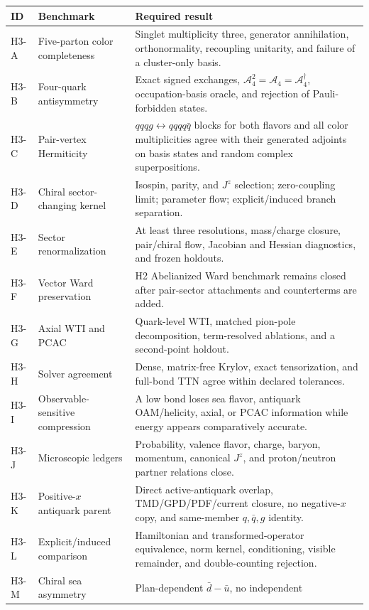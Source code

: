 \documentclass[11pt]{article}
\newcommand{\cA}{\mathcal A}
\newcommand{\Jz}{J^z}
\begin{document}
\begin{longtable}{L{0.12\textwidth}L{0.28\textwidth}L{0.50\textwidth}}
\toprule
ID & Benchmark & Required result\\
\midrule
\endhead
H3-A & Five-parton color completeness & Singlet multiplicity three,
generator annihilation, orthonormality, recoupling unitarity, and failure of a
cluster-only basis.\\
H3-B & Four-quark antisymmetry & Exact signed exchanges,
\(\cA_4^2=\cA_4=\cA_4^{\dagger}\), occupation-basis oracle, and rejection of
Pauli-forbidden states.\\
H3-C & Pair-vertex Hermiticity & \(qqqg\leftrightarrow qqqq\bar q\) blocks
for both flavors and all color multiplicities agree with their generated
adjoints on basis states and random complex superpositions.\\
H3-D & Chiral sector-changing kernel & Isospin, parity, and \(\Jz\) selection;
zero-coupling limit; parameter flow; explicit/induced branch separation.\\
H3-E & Sector renormalization & At least three resolutions, mass/charge
closure, pair/chiral flow, Jacobian and Hessian diagnostics, and frozen
holdouts.\\
H3-F & Vector Ward preservation & H2 Abelianized Ward benchmark remains
closed after pair-sector attachments and counterterms are added.\\
H3-G & Axial WTI and PCAC & Quark-level WTI, matched pion-pole
decomposition, term-resolved ablations, and a second-point holdout.\\
H3-H & Solver agreement & Dense, matrix-free Krylov, exact tensorization, and
full-bond TTN agree within declared tolerances.\\
H3-I & Observable-sensitive compression & A low bond loses sea flavor,
antiquark OAM/helicity, axial, or PCAC information while energy appears
comparatively accurate.\\
H3-J & Microscopic ledgers & Probability, valence flavor, charge, baryon,
momentum, canonical \(\Jz\), and proton/neutron partner relations close.\\
H3-K & Positive-\(x\) antiquark parent & Direct active-antiquark overlap,
TMD/GPD/PDF/current closure, no negative-\(x\) copy, and same-member
\(q,\bar q,g\) identity.\\
H3-L & Explicit/induced comparison & Hamiltonian and transformed-operator
equivalence, norm kernel, conditioning, visible remainder, and double-counting
rejection.\\
H3-M & Chiral sea asymmetry & Plan-dependent \(\bar d-\bar u\), no independent

\end{longtable}
\end{document}
